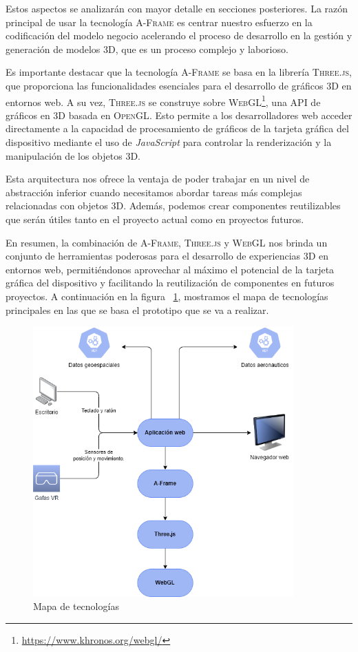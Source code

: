 \documentclass[a4paper, 11pt]{book}
\begin{document}
Estos aspectos se analizarán con mayor detalle en secciones posteriores. 
La razón principal de usar la tecnología \textsc{A-Frame} es centrar nuestro esfuerzo en la codificación del modelo negocio acelerando el proceso de desarrollo en la gestión y generación de modelos \textsc{3D}, que es un proceso complejo y laborioso.

Es importante destacar que la tecnología \textsc{A-Frame} se basa en la librería \textsc{Three.js}, que proporciona las funcionalidades esenciales para el desarrollo de gráficos \textsc{3D} en entornos web. A su vez, \textsc{Three.js} se construye sobre \textsc{WebGL}\footnote{\url{https://www.khronos.org/webgl/}}, una \Gls{API} de gráficos en \textsc{3D} basada en \textsc{OpenGL}. Esto permite a los desarrolladores web acceder directamente a la capacidad de procesamiento de gráficos de la tarjeta gráfica del dispositivo mediante el uso de \emph{JavaScript} para controlar la renderización y la manipulación de los objetos \textsc{3D}.

Esta arquitectura nos ofrece la ventaja de poder trabajar en un nivel de abstracción inferior cuando necesitamos abordar tareas más complejas relacionadas con objetos \textsc{3D}. Además, podemos crear componentes reutilizables que serán útiles tanto en el proyecto actual como en proyectos futuros.

En resumen, la combinación de \textsc{A-Frame}, \textsc{Three.js} y \textsc{WebGL} nos brinda un conjunto de herramientas poderosas para el desarrollo de experiencias \textsc{3D} en entornos web, permitiéndonos aprovechar al máximo el potencial de la tarjeta gráfica del dispositivo y facilitando la reutilización de componentes en futuros proyectos.
A continuación en la figura ~\ref{figura:mapaTecnologias}, mostramos el mapa de tecnologías principales en las que se basa el prototipo que se va a realizar. 
 \begin{figure}[h]
    \centering
    \includegraphics[bb=0 0 564 586, width=10cm, keepaspectratio]{img/mapaFuncional.drawio.png}
    \caption{Mapa de tecnologías}
    \label{figura:mapaTecnologias}
 \end{figure}
\clearpage
\end{document}
